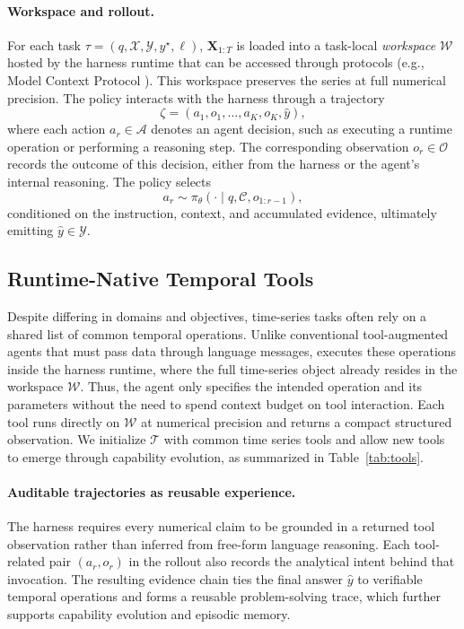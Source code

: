 \paragraph{Workspace and rollout.}
For each task $\tau=(q,\mathcal{X},\mathcal{Y},y^\star,\ell)$, $\mathbf{X}_{1:T}$ is loaded into a task-local \emph{workspace} $\mathcal{W}$ hosted by the harness runtime that
can be accessed through protocols (e.g., Model Context Protocol \citep{mcp2024}). This
workspace preserves the series at full numerical precision. The policy interacts with the harness through a
trajectory
\begin{equation}
    \zeta=(a_1,o_1,\ldots,a_K,o_K,\hat{y}),
\end{equation}
where each action $a_r\in\mathcal{A}$ denotes an agent decision, such as executing a runtime operation or performing a reasoning step. The corresponding observation $o_r\in\mathcal{O}$ records the outcome of this decision, either from the harness or the agent's internal reasoning. The policy selects
\begin{equation}
    a_r\sim\pi_\theta(\cdot\mid q,\mathcal{C},o_{1:r-1}),
\end{equation}
conditioned on the instruction, context, and accumulated evidence, ultimately emitting $\hat{y}\in\mathcal{Y}$.


\subsection{Runtime-Native Temporal Tools}
\label{sec:tools}

Despite differing in domains and objectives, time-series tasks often rely on a shared list of common temporal operations. Unlike conventional tool-augmented agents that must pass data through language messages, \method executes these operations inside the harness runtime, where the full time-series object already resides in the workspace $\mathcal{W}$. Thus, the agent only specifies the intended operation and its parameters without the need to spend context budget on tool interaction. Each tool runs directly on $\mathcal{W}$ at numerical precision and returns a compact structured observation. We initialize $\mathcal{T}$ with common time series tools and allow new tools to emerge through capability evolution, as summarized in Table~\ref{tab:tools}.

\paragraph{Auditable trajectories as reusable experience.}
The harness requires every numerical claim to be grounded in a returned tool observation rather than inferred from free-form language reasoning.
Each tool-related pair $(a_r,o_r)$ in the rollout also records the analytical intent behind that invocation. The resulting evidence chain ties the final answer $\hat{y}$ to verifiable temporal operations and forms a reusable problem-solving trace, which further supports capability evolution and episodic memory.



